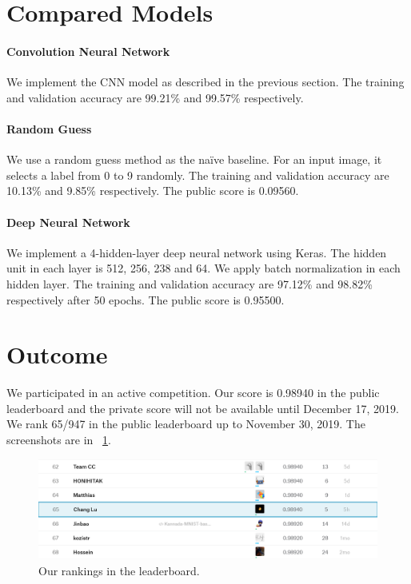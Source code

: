 \documentclass[]{article}
\begin{document}
\section{Compared Models}

\paragraph{Convolution Neural Network}
We implement the CNN model as described in the previous section. The training and validation accuracy are 99.21\% and 99.57\% respectively.

\paragraph{Random Guess}
We use a random guess method as the na\"ive baseline. For an input image, it selects a label from 0 to 9 randomly. The training and validation accuracy are 10.13\% and 9.85\% respectively. The public score is 0.09560.

\paragraph{Deep Neural Network}
We implement a 4-hidden-layer deep neural network using Keras. The hidden unit in each layer is 512, 256, 238 and 64. We apply batch normalization in each hidden layer. The training and validation accuracy are 97.12\% and 98.82\% respectively after 50 epochs. The public score is 0.95500.

\section{Outcome}
We participated in an active competition. Our score is 0.98940 in the public leaderboard and the private score will not be available until December 17, 2019. We rank 65/947 in the public leaderboard up to November 30, 2019. The screenshots are in \figurename{~\ref{fig:rank}}.
\begin{figure}[H]
    \centering
    \includegraphics[width=14.5cm]{figs/rank}
    \caption{Our rankings in the leaderboard.}
    \label{fig:rank}
\end{figure}

\printbibliography
\end{document}
